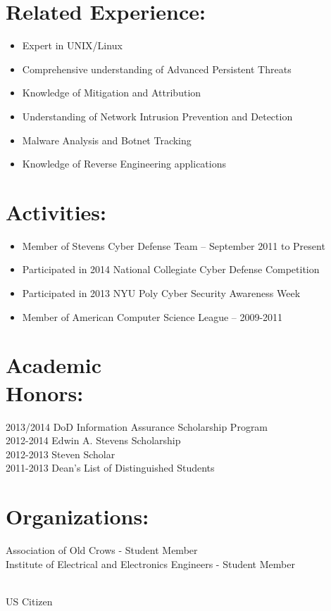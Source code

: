 \documentclass[margin]{res}
\begin{document}
\begin{resume}
\section{Related Experience:}
\begin{itemize} \itemsep -2pt %
\item Expert in UNIX/Linux
\item Comprehensive understanding of Advanced Persistent Threats
\item Knowledge of Mitigation and Attribution
\item Understanding of Network Intrusion Prevention and Detection
\item Malware Analysis and Botnet Tracking
\item Knowledge of Reverse Engineering applications
\end{itemize}

\section{Activities:}
\begin{itemize} \itemsep -2pt
\item Member of Stevens Cyber Defense Team – September 2011 to Present
\item Participated in 2014 National Collegiate Cyber Defense  Competition
\item Participated in 2013 NYU Poly Cyber Security Awareness Week
\item Member of American Computer Science League – 2009-2011
\end{itemize}

\section{Academic \\ Honors:} 
2013/2014 DoD Information Assurance Scholarship Program \\
2012-2014 Edwin A. Stevens Scholarship  \\
2012-2013 Steven Scholar \\
2011-2013 Dean's List of Distinguished Students

\section{Organizations:}
Association of Old Crows - Student Member \\ 
Institute of Electrical and Electronics Engineers - Student Member\\

\end{resume} 
\centerline{\\ US Citizen}
\end{document}
